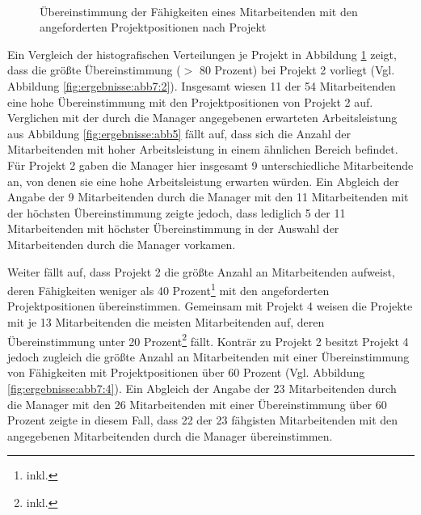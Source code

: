 \begin{figure}
    \\
\caption[Übereinstimmung der Fähigkeiten eines Mitarbeitenden mit den angeforderten Projektpositionen nach Projekt]{Übereinstimmung der Fähigkeiten eines Mitarbeitenden mit den angeforderten Projektpositionen nach Projekt}
  \label{fig:ergebnisse:abb7}
\end{figure}

Ein Vergleich der histografischen Verteilungen je Projekt in Abbildung \ref{fig:ergebnisse:abb7} zeigt, dass die größte Übereinstimmung ($>$ 80 Prozent) bei Projekt 2 vorliegt (Vgl. Abbildung \ref{fig:ergebnisse:abb7:2}).
Insgesamt wiesen 11 der 54 Mitarbeitenden eine hohe Übereinstimmung mit den Projektpositionen von Projekt 2 auf.
Verglichen mit der durch die Manager angegebenen erwarteten Arbeitsleistung aus Abbildung \ref{fig:ergebnisse:abb5} fällt auf, dass sich die Anzahl der Mitarbeitenden mit hoher Arbeitsleistung in einem ähnlichen Bereich befindet.
Für Projekt 2 gaben die Manager hier insgesamt 9 unterschiedliche Mitarbeitende an, von denen sie eine hohe Arbeitsleistung erwarten würden.
Ein Abgleich der Angabe der 9 Mitarbeitenden durch die Manager mit den 11 Mitarbeitenden mit der höchsten Übereinstimmung zeigte jedoch, dass lediglich 5 der 11 Mitarbeitenden mit höchster Übereinstimmung in der Auswahl der Mitarbeitenden durch die Manager vorkamen.

Weiter fällt auf, dass Projekt 2 die größte Anzahl an Mitarbeitenden aufweist, deren Fähigkeiten weniger als 40 Prozent\footnote{inkl.} mit den angeforderten Projektpositionen übereinstimmen.
Gemeinsam mit Projekt 4 weisen die Projekte mit je 13 Mitarbeitenden die meisten Mitarbeitenden auf, deren Übereinstimmung unter 20 Prozent\footnote{inkl.} fällt.
Konträr zu Projekt 2 besitzt Projekt 4 jedoch zugleich die größte Anzahl an Mitarbeitenden mit einer Übereinstimmung von Fähigkeiten mit Projektpositionen über 60 Prozent (Vgl. Abbildung \ref{fig:ergebnisse:abb7:4}).
Ein Abgleich der Angabe der 23 Mitarbeitenden durch die Manager mit den 26 Mitarbeitenden mit einer Übereinstimmung über 60 Prozent zeigte in diesem Fall, dass 22 der 23 fähgisten Mitarbeitenden mit den angegebenen Mitarbeitenden durch die Manager übereinstimmen.

